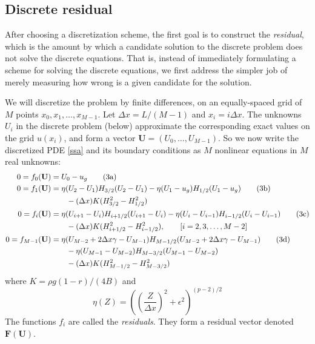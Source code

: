 \documentclass[11pt,final,reqno]{amsart}
\newcommand{\eps}{\epsilon}
\newcommand{\bbF}{\mathbf{F}}
\newcommand{\bU}{\mathbf{U}}
\begin{document}
\subsection*{Discrete residual}   After choosing a discretization scheme, the first goal is to construct the \emph{residual}, which is the amount by which a candidate solution to the discrete problem does not solve the discrete equations.  That is, instead of immediately formulating a scheme for solving the discrete equations, we first address the simpler job of merely measuring how wrong is a given candidate for the solution.

We will discretize the problem by finite differences, on an equally-spaced grid of $M$ points $x_0,x_1,\dots,x_{M-1}$.  Let $\Delta x = L / (M-1)$ and $x_i = i \Delta x$.  The unknowns $U_i$ in the discrete problem (below) approximate the corresponding exact values on the grid $u(x_i)$, and form a vector $\bU = (U_0,\dots,U_{M-1})$.  So we now write the discretized PDE \eqref{ssa} and its boundary conditions as $M$ nonlinear equations in $M$ real unknowns:
\begin{align}
  0 = f_0(\bU) &= U_0 - u_g \tag{3a} \label{reszero} \\
  0 = f_1(\bU) &= \eta(U_2-U_1) H_{3/2} (U_2 - U_1) - \eta(U_1 - u_g) H_{1/2} (U_1 - u_g) \tag{3b} \label{resone}\\
               &\qquad - (\Delta x) K (H_{3/2}^2 - H_{1/2}^2) \notag \\
  0 = f_i(\bU) &= \eta(U_{i+1}-U_i) H_{i+1/2} (U_{i+1} - U_i) - \eta(U_i - U_{i-1}) H_{i-1/2} (U_i - U_{i-1}) \tag{3c}  \label{resi}\\
               &\qquad - (\Delta x) K (H_{i+1/2}^2 - H_{i-1/2}^2), \qquad [i=2,3,\dots,M-2] \notag \\
  0 = f_{M-1}(\bU) &= \eta(U_{M-2} + 2\Delta x \gamma - U_{M-1}) H_{M-1/2} (U_{M-2} + 2\Delta x \gamma - U_{M-1})  \tag{3d} \label{resend} \\
               &\qquad - \eta(U_{M-1} - U_{M-2}) H_{M-3/2} (U_{M-1} - U_{M-2}) \notag\\
               &\qquad - (\Delta x) K (H_{M-1/2}^2 - H_{M-3/2}^2) \notag
\end{align}
where $K = \rho g (1-r)/(4 B)$ and \setcounter{equation}{3}
\begin{equation}
  \eta(Z) = \left(\left(\frac{Z}{\Delta x}\right)^2 + \eps^2\right)^{(p-2)/2} \label{visc}
\end{equation}
The functions $f_i$ are called the \emph{residuals}.  They form a residual vector denoted $\bbF(\bU)$.
\end{document}
